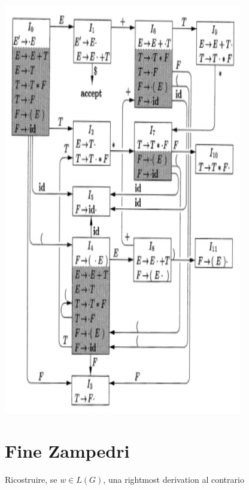 \begin{center}
    \includegraphics[scale=0.6]{Chapters/Img/c04_09.png}\\
\end{center}



\section{Fine Zampedri}
Ricostruire, se $w \in L(G)$, una rightmost derivation al contrario

